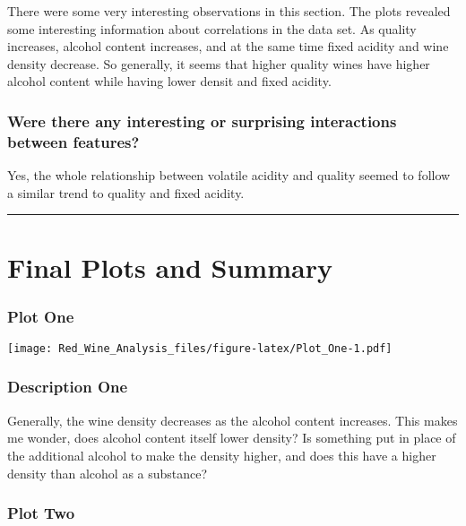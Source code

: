 \documentclass[]{article}
\begin{document}
There were some very interesting observations in this section. The plots
revealed some interesting information about correlations in the data
set. As quality increases, alcohol content increases, and at the same
time fixed acidity and wine density decrease. So generally, it seems
that higher quality wines have higher alcohol content while having lower
densit and fixed acidity.

\hypertarget{were-there-any-interesting-or-surprising-interactions-between-features}{%
\subsubsection{Were there any interesting or surprising interactions
between
features?}\label{were-there-any-interesting-or-surprising-interactions-between-features}}

Yes, the whole relationship between volatile acidity and quality seemed
to follow a similar trend to quality and fixed acidity.

\begin{center}\rule{0.5\linewidth}{\linethickness}\end{center}

\hypertarget{final-plots-and-summary}{%
\section{Final Plots and Summary}\label{final-plots-and-summary}}

\hypertarget{plot-one}{%
\subsubsection{Plot One}\label{plot-one}}

\texttt{[image: Red\_Wine\_Analysis\_files/figure-latex/Plot\_One-1.pdf]}

\hypertarget{description-one}{%
\subsubsection{Description One}\label{description-one}}

Generally, the wine density decreases as the alcohol content increases.
This makes me wonder, does alcohol content itself lower density? Is
something put in place of the additional alcohol to make the density
higher, and does this have a higher density than alcohol as a substance?

\hypertarget{plot-two}{%
\subsubsection{Plot Two}\label{plot-two}}
\end{document}
